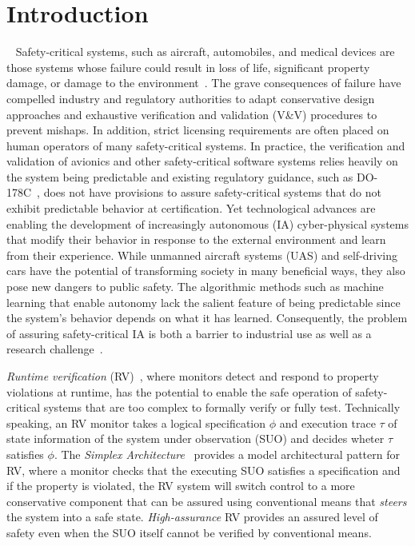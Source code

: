 \section{Introduction}~\label{sec:intro} Safety-critical systems, such
as aircraft, automobiles, and medical devices are those systems whose
failure could result in loss of life, significant property damage, or
damage to the environment~\cite{Knight2002}.  The grave consequences
of failure have compelled industry and regulatory authorities to adapt
conservative design approaches and exhaustive verification and
validation (V\&V) procedures to prevent mishaps. In addition, strict
licensing requirements are often placed on human operators of many
safety-critical systems.  In practice, the verification and validation
of avionics and other safety-critical software systems relies heavily
on the system  being predictable and existing regulatory guidance, such as
DO-178C~\cite{DO178B}, does not have provisions to assure
safety-critical systems that do not exhibit predictable behavior at
certification.  Yet technological advances are enabling the
development of increasingly autonomous (IA) cyber-physical systems
that modify their behavior in response to the external environment and
learn from their experience.  While unmanned aircraft systems (UAS)
and self-driving cars have the potential of transforming society in
many beneficial ways, they also pose new dangers to public safety. The
algorithmic methods such as machine learning that enable autonomy lack
the salient feature of being predictable since the system's behavior
depends on what it has learned.  Consequently, the problem of assuring
safety-critical IA is both a barrier to industrial use  as well as a
research challenge~\cite{NRC14}.


\emph{Runtime verification} (RV)~\cite{monitors}, where monitors
detect and respond to property violations at runtime, has the
potential to enable the safe operation of safety-critical systems that
are too complex to formally verify or fully test.  Technically
speaking, an RV monitor takes a logical specification $\phi$ and
execution trace $\tau$ of state information of the system under
observation (SUO) and decides wheter $\tau$ satisfies $\phi$. The
\emph{Simplex Architecture}~\cite{simplex} provides a model
architectural pattern for RV, where a monitor checks that the
executing SUO satisfies a specification and if the property is
violated, the RV system will switch control to a more conservative
component that can be assured using conventional means that
\emph{steers} the system into a safe state. \emph{High-assurance} RV
provides an assured level of safety even when the SUO itself cannot be
verified by conventional means.

